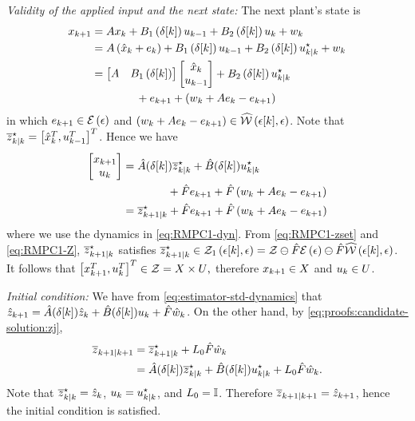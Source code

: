 \noindent\textit{Validity of the applied input and the next state:}
%
The next plant's state is 
\begin{align*}
x_{k+1} & =Ax_{k}+B_{1}\left(\delta[k]\right)u_{k-1}+B_{2}\left(\delta[k]\right)u_{k}+w_{k}\\
 & =A\left(\hat{x}_{k}+e_{k}\right)+B_{1}\left(\delta[k]\right)u_{k-1}+B_{2}\left(\delta[k]\right)u_{k| k}^{\star}+w_{k}\\
 & =\begin{bmatrix}A & B_{1}\left(\delta[k]\right)\end{bmatrix}\begin{bmatrix}\hat{x}_{k}\\
u_{k-1}
\end{bmatrix}+B_{2}\left(\delta[k]\right)u_{k| k}^{\star} \\
&\qquad\qquad + e_{k+1}+\left(w_{k}+Ae_{k}-e_{k+1}\right)
\end{align*}
in which $e_{k+1}\in\mathcal{E}\left(\epsilon\right)$ and $\left(w_{k}+Ae_{k}-e_{k+1}\right)\in\widehat{\mathcal{W}}\left(\epsilon[k],\epsilon\right)$.
Note that $\overline{z}_{k| k}^{\star}=\left[\hat{x}_{k}^{T},u_{k-1}^{T}\right]^{T}$.
Hence we have
\begin{align*}
\begin{bmatrix}x_{k+1}\\
u_{k}
\end{bmatrix} & =\hat{A}(\delta[k])\overline{z}_{k| k}^{\star}+\hat{B}(\delta[k])u_{k| k}^{\star}\\
&\qquad\qquad +\hat{F}e_{k+1}+\hat{F}\left(w_{k}+Ae_{k}-e_{k+1}\right)\\
 & =\overline{z}_{k+1| k}^{\star}+\hat{F}e_{k+1}+\hat{F}\left(w_{k}+Ae_{k}-e_{k+1}\right)
\end{align*}
where we use the dynamics in \eqref{eq:RMPC1-dyn}. From \eqref{eq:RMPC1-zset}
and \eqref{eq:RMPC1-Z}, $\overline{z}_{k+1| k}^{\star}$ satisfies $\overline{z}_{k+1| k}^{\star}\in\mathcal{Z}_{1}\left(\epsilon[k],\epsilon\right)=\mathcal{Z}\ominus\hat{F}\mathcal{E}\left(\epsilon\right)\ominus\hat{F}\widehat{\mathcal{W}}\left(\epsilon[k],\epsilon\right)$.
It follows that
\(
\left[ x_{k+1}^{T}, u_{k}^{T} \right]^{T} \in \mathcal{Z} = X\times U\text{,}
\)
therefore  $x_{k+1}\in X$ and $u_{k}\in U$.


\noindent\textit{Initial condition:}
%
We have from \eqref{eq:estimator-std-dynamics} that $\hat{z}_{k+1}=\hat{A}(\delta[k])\hat{z}_{k}+\hat{B}(\delta[k])u_{k}+\hat{F}\hat{w}_{k}$.
On the other hand, by \eqref{eq:proofs:candidate-solution:zj},
\begin{align*}
\overline{z}_{k+1| k+1} & =\overline{z}_{k+1| k}^{\star}+L_{0}\hat{F}\hat{w}_{k}\\
 & =\hat{A}(\delta[k])\overline{z}_{k| k}^{\star}+\hat{B}(\delta[k])u_{k| k}^{\star}+L_{0}\hat{F}\hat{w}_{k}\text{.}
\end{align*}
Note that $\overline{z}_{k| k}^{\star}=\hat{z}_{k}$, $u_{k}=u_{k| k}^{\star}$,
and $L_{0}=\mathbb{I}$. Therefore $\overline{z}_{k+1| k+1}=\hat{z}_{k+1}$,
hence the initial condition is satisfied.


